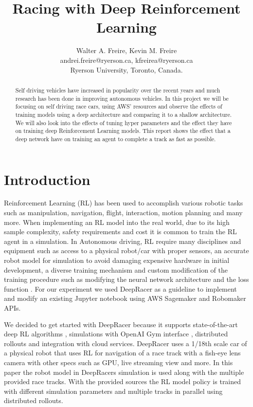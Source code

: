 \documentclass[journal]{IEEEtran}
\begin{document}
\title{Racing with Deep Reinforcement Learning}
\author{Walter A. Freire, Kevin M. Freire\\
andrei.freire@ryerson.ca, kfreirea@ryerson.ca\\
Ryerson University, Toronto, Canada.}
\maketitle

\begin{abstract}
Self driving vehicles have increased in popularity over the recent years and much research has been done in improving autonomous vehicles.  In this project we will be focusing on self driving race cars, using AWS' resources and observe the effects of training models using a deep architecture and comparing it to a shallow architecture.  We will also look into the effects of tuning hyper parameters and the effect they have on training deep Reinforcement Learning models.  This report shows the effect that a deep network have on training an agent to complete a track as fast as possible.
\end{abstract}

\section{Introduction}
Reinforcement Learning (RL) has been used to accomplish various robotic tasks such as manipulation, navigation, flight, interaction, motion planning and many more. When implementing an RL model into the real world, due to its high sample complexity, safety requirements and cost it is common to train the RL agent in a simulation. In Autonomous driving, RL require many disciplines and equipment such as access to a physical robot/car with proper sensors, an accurate robot model for simulation to avoid damaging expensive hardware in initial development, a diverse training mechanism and custom modification of the training procedure such as modifying the neural network architecture and the loss function \cite{9197465}. For our experiment we used DeepRacer as a guideline to implement and modify an existing Jupyter notebook using AWS Sagemaker and Robomaker APIs.

We decided to get started with DeepRacer because it supports state-of-the-art deep RL algorithms \cite{caspi10reinforcement}, simulations with OpenAI Gym interface \cite{brockman2016openai}, distributed rollouts and integration with cloud services. DeepRacer uses a 1/18th scale car of a physical robot that uses RL for navigation of a race track with a fish-eye lens camera \cite{9197465} with other specs such as GPU, live streaming view and more. In this paper the robot model in DeepRacers simulation is used along with the multiple provided race tracks. With the provided sources the RL model policy is trained with different simulation parameters and multiple tracks in parallel using distributed rollouts.
\end{document}
